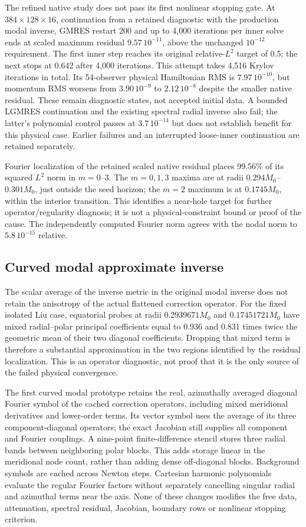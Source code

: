 \documentclass[aps,prd,preprint,notitlepage,nofootinbib]{revtex4-2}
\begin{document}
The refined native study does not pass its first nonlinear stopping gate.
At $384\times128\times16$, continuation from a retained diagnostic with the
production modal inverse, GMRES restart 200 and up to 4,000 iterations per
inner solve ends at scaled maximum residual $9.57\,10^{-11}$, above the
unchanged $10^{-12}$ requirement. The first inner step reaches its original
relative-$L^2$ target of 0.5; the next stops at 0.642 after 4,000 iterations.
This attempt takes 4,516 Krylov iterations in total. Its 54-observer physical
Hamiltonian RMS is $7.97\,10^{-10}$, but momentum RMS worsens from
$3.90\,10^{-9}$ to $2.12\,10^{-8}$ despite the smaller native residual.
These remain diagnostic states, not accepted initial data. A bounded LGMRES
continuation and the existing spectral radial inverse also fail; the latter's
polynomial control passes at $3.7\,10^{-14}$ but does not establish benefit
for this physical case. Earlier failures and an interrupted loose-inner
continuation are retained separately.

Fourier localization of the retained scaled native residual places
99.56\% of its squared $L^2$ norm in $m=0$--3. The $m=0,1,3$ maxima
are at radii $0.294M_0$--$0.301M_0$, just outside the seed horizon;
the $m=2$ maximum is at $0.1745M_0$, within the interior transition.
This identifies a near-hole target for further operator/regularity diagnosis;
it is not a physical-constraint bound or proof of the cause. The independently
computed Fourier norm agrees with the nodal norm to $5.8\,10^{-15}$ relative.

\subsection{Curved modal approximate inverse}
The scalar average of the inverse metric in the original modal inverse
does not retain the anisotropy of the actual flattened correction operator.
For the fixed isolated Liu case, equatorial probes at radii $0.2939671M_0$
and $0.17451721M_0$ have mixed radial--polar principal coefficients equal
to 0.936 and 0.831 times twice the geometric mean of their two diagonal
coefficients. Dropping that mixed term is therefore a substantial
approximation in the two regions identified by the residual localization.
This is an operator diagnostic, not proof that it is the only source of
the failed physical convergence.

The first curved modal prototype retains the real, azimuthally averaged
diagonal Fourier symbol of the cached correction operators, including
mixed meridional derivatives and lower-order terms. Its vector symbol
uses the average of its three component-diagonal operators; the exact
Jacobian still supplies all component and Fourier couplings. A nine-point
finite-difference stencil stores three radial bands between neighboring
polar blocks. This adds storage linear in the meridional node count,
rather than adding dense off-diagonal blocks. Background symbols are
cached across Newton steps. Cartesian harmonic polynomials evaluate the
regular Fourier factors without separately cancelling singular radial
and azimuthal terms near the axis. None of these changes modifies the
free data, attenuation, spectral residual, Jacobian, boundary rows or
nonlinear stopping criterion.
\end{document}

